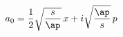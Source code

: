 \begin{equation}
a_0=\frac{1}{2}\sqrt{\frac{s}{\ap}}\,x+i\sqrt{\frac{\ap}{s}}\,p
\label{a0}
\end{equation}

